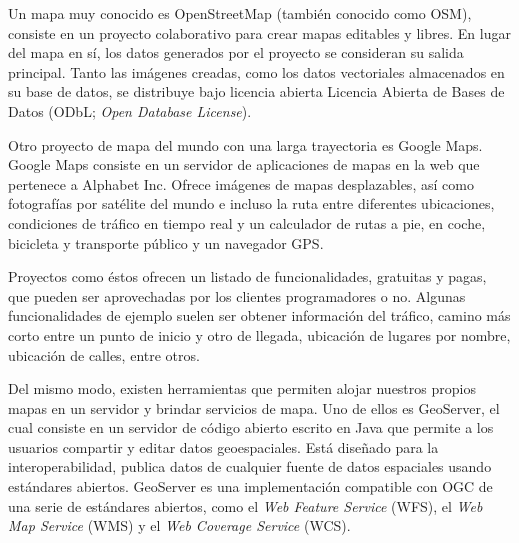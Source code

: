Un mapa muy conocido es OpenStreetMap (también conocido como OSM), consiste en un proyecto colaborativo para crear mapas editables y libres. En lugar del mapa en sí, los datos generados por el proyecto se consideran su salida principal. Tanto las imágenes creadas, como los datos vectoriales almacenados en su base de datos, se distribuye bajo licencia abierta Licencia Abierta de Bases de Datos (ODbL; \textit{Open Database License}).

Otro proyecto de mapa del mundo con una larga trayectoria es Google Maps. Google Maps consiste en un servidor de aplicaciones de mapas en la web que pertenece a Alphabet Inc. Ofrece imágenes de mapas desplazables, así como fotografías por satélite del mundo e incluso la ruta entre diferentes ubicaciones, condiciones de tráfico en tiempo real y un calculador de rutas a pie, en coche, bicicleta y transporte público y un navegador GPS.

Proyectos como éstos ofrecen un listado de funcionalidades, gratuitas y pagas, que pueden ser aprovechadas por los clientes programadores o no. Algunas funcionalidades de ejemplo suelen ser obtener información del tráfico, camino más corto entre un punto de inicio y otro de llegada, ubicación de lugares por nombre, ubicación de calles, entre otros.

Del mismo modo, existen herramientas que permiten alojar nuestros propios mapas en un servidor y brindar servicios de mapa. Uno de ellos es GeoServer, el cual consiste en un servidor de código abierto escrito en Java que permite a los usuarios compartir y editar datos geoespaciales. Está diseñado para la interoperabilidad, publica datos de cualquier fuente de datos espaciales usando estándares abiertos. GeoServer es una implementación compatible con OGC de una serie de estándares abiertos, como el \textit{Web Feature Service} (WFS), el \textit{Web Map Service} (WMS) y el \textit{Web Coverage Service} (WCS).